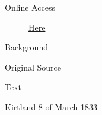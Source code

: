 			\begin{description}
				\item[Online Access] \href{https://www.josephsmithpapers.org/paper-summary/revelation-8-march-1833-dc-90/1}{Here}
			\end{description}
			
			\begin{description}
				\item[Background]
			\end{description}
			
			
			\begin{description}
				\item[Original Source]
			\end{description}
			
			
			\begin{description}
				\item[Text]
			\end{description}
			
				\begin{tightcenter}
				Kirtland 8 of March 1833
				\end{tightcenter}
				
